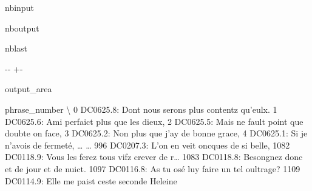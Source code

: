 \documentclass[letterpaper,10pt,english]{sphinxmanual}
\newlength\nbsphinxcodecellspacing
\begin{document}
\begin{sphinxuseclass}{nbinput}
{
\begin{sphinxVerbatim}[commandchars=\\\{\}]
\llap{\color{nbsphinxin}[27]:\,\hspace{\fboxrule}\hspace{\fboxsep}}
\end{sphinxVerbatim}
}

\end{sphinxuseclass}
\begin{sphinxuseclass}{nboutput}
\begin{sphinxuseclass}{nblast}
{

\kern-\sphinxverbatimsmallskipamount\kern-\baselineskip
\kern+\FrameHeightAdjust\kern-\fboxrule
\vspace{\nbsphinxcodecellspacing}

\begin{sphinxuseclass}{output_area}
\begin{sphinxuseclass}{}


\begin{sphinxVerbatim}[commandchars=\\\{\}]
\llap{\color{nbsphinxout}[27]:\,\hspace{\fboxrule}\hspace{\fboxsep}}                                          phrase\_number  \textbackslash{}
0     DC0625.8: Dont nous serons plus contentz qu'eulx.
1            DC0625.6: Ami perfaict plus que les dieux,
2     DC0625.5: Mais ne fault point que doubte on face,
3           DC0625.2: Non plus que j'ay de bonne grace,
4                   DC0625.1: Si je n'avois de fermeté,
{\ldots}                                                 {\ldots}
996         DC0207.3: L’on en veit oncques de si belle,
1082  DC0118.9: Vous les ferez tous vifz crever de r{\ldots}
1083   DC0118.8: Besongnez donc et de jour et de nuict.
1097     DC0116.8: As tu osé luy faire un tel oultrage?
1109      DC0114.9: Elle me paist ceste seconde Heleine


\end{sphinxVerbatim}
\end{sphinxuseclass}
\end{sphinxuseclass}}
\end{sphinxuseclass}
\end{sphinxuseclass}
\end{document}
